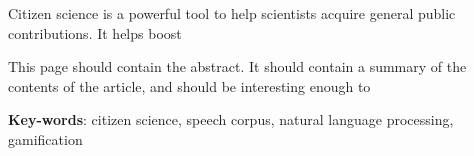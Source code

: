 
\setlength{\absparsep}{18pt}
\begin{resumo}
    Citizen science is a powerful tool to help scientists acquire general public contributions. It helps boost 
    
    This page should contain the abstract. It should contain a summary of the contents of the article, and should be interesting enough to  
	\vspace{\onelineskip}
	\noindent 
	
	\textbf{Key-words}: citizen science, speech corpus, natural language processing, gamification
\end{resumo}
